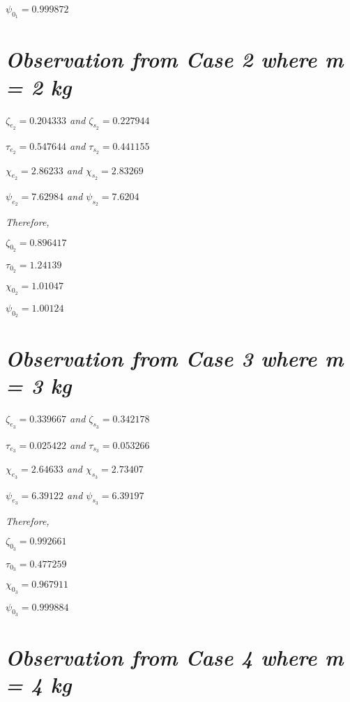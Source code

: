     $\psi_{0_1} = 0.999872$    
            
        
        
\section{\textit{Observation from Case 2 where m = 2 kg}}
        
    \textit{$\zeta_{e_2} = 0.204333$ and $\zeta_{s_2} = 0.227944$}
            
    \textit{$\tau_{e_2} = 0.547644$ and $\tau_{s_2} = 0.441155$}
            
    \textit{$\chi_{e_2} = 2.86233$ and $\chi_{s_2} = 2.83269$}
            
    \textit{$\psi_{e_2} = 7.62984$ and $\psi_{s_2} = 7.6204$}
            
    \textit{Therefore,}
            
    $\zeta_{0_2} = 0.896417$
            
    $\tau_{0_2} = 1.24139$
            
    $\chi_{0_2} = 1.01047$
            
    $\psi_{0_2} = 1.00124$    
            
        
        
\section{\textit{Observation from Case 3 where m = 3 kg}}
        
    \textit{$\zeta_{e_3} = 0.339667$ and $\zeta_{s_3} = 0.342178$}
            
    \textit{$\tau_{e_3} = 0.025422$ and $\tau_{s_3} = 0.053266$}
            
    \textit{$\chi_{e_3} = 2.64633$ and $\chi_{s_3} = 2.73407$}
            
    \textit{$\psi_{e_3} = 6.39122$ and $\psi_{s_3} = 6.39197$}
            
    \textit{Therefore,}
            
    $\zeta_{0_3} = 0.992661$
            
    $\tau_{0_3} = 0.477259$
            
    $\chi_{0_3} = 0.967911$
            
    $\psi_{0_3} = 0.999884$    
            
        
        
\section{\textit{Observation from Case 4 where m = 4 kg}}
        
